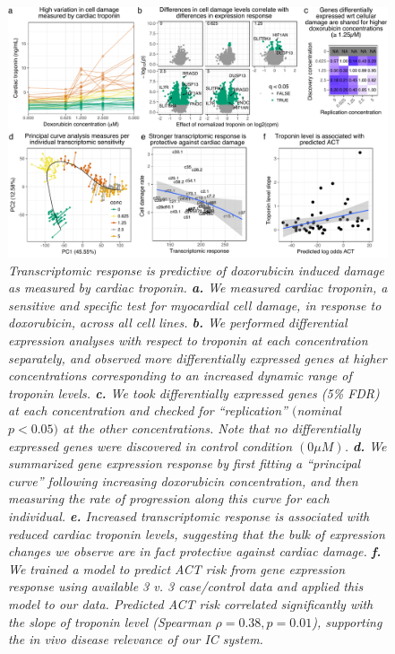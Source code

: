 \documentclass{article}
\begin{document}
\begin{figure}
\begin{center}
    \includegraphics[width=1\textwidth]{../figures/fig4_troponin.pdf}     \caption{\it{Transcriptomic response is predictive of doxorubicin induced damage as measured by cardiac troponin. \textbf{a.} We measured cardiac troponin, a sensitive and specific test for myocardial cell damage, in response to doxorubicin, across all cell lines. \textbf{b.} We performed differential expression analyses with respect to troponin at each concentration separately, and observed more differentially expressed genes at higher concentrations corresponding to an increased dynamic range of troponin levels. \textbf{c.} We took differentially expressed genes (5\% FDR) at each concentration and checked for ``replication'' $($nominal $p<0.05)$ at the other concentrations. Note that no differentially expressed genes were discovered in control condition $(0 \mu M)$. \textbf{d.} We summarized gene expression response by first fitting a ``principal curve'' following increasing doxorubicin concentration, and then measuring the rate of progression along this curve for each individual. \textbf{e.} Increased transcriptomic response is associated with reduced cardiac troponin levels, suggesting that the bulk of expression changes we observe are in fact protective against cardiac damage. \textbf{f.} We trained a model to predict ACT risk from gene expression response using available 3 v. 3 case/control data\cite{Burridge2016} and applied this model to our data. Predicted ACT risk correlated significantly with the slope of troponin level (Spearman $\rho=0.38, p=0.01$), supporting the \emph{in vivo} disease relevance of our IC system. }}
    \label{fig_troponin}
    \end{center}
\end{figure}
\end{document}
